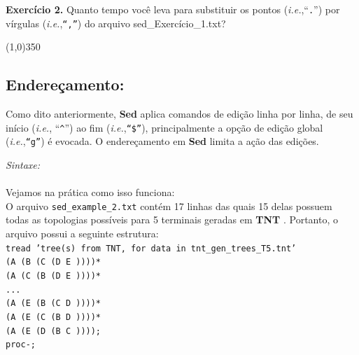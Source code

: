 \begin{refsection}

\begin{blackBlock}{\textbf{Exercício 2.}}\label{tut2:ex:2.\arabic{ex}}
Quanto tempo você leva para substituir os pontos (\textit{i.e.},``\texttt{.}'') por vírgulas (\textit{i.e.},\texttt{``,''}) do arquivo sed\_Exercício\_1.txt?

\begin{center}
\line(1,0){350}\\
\end{center}

\end{blackBlock}

\subsection{Endereçamento:}\label{tut2:sed:address}

	Como dito anteriormente, \textbf{Sed} aplica comandos de edição linha por linha, de seu início (\textit{i.e.}, ``\texttt{\^{}}'') ao fim (\textit{i.e.},\texttt{``\$''}), principalmente a opção de edição global (\textit{i.e.},\texttt{``g''}) é evocada. O endereçamento em \textbf{Sed} limita a ação das edições.\

\textit{Sintaxe:}\\
 \\

Vejamos na prática como isso funciona:\\

O arquivo \texttt{sed\_example\_2.txt} contém 17 linhas das quais 15 delas possuem todas as topologias possíveis para 5 terminais geradas em \textbf{TNT} \parencite{GoloboffEtAl_2008}. Portanto, o arquivo possui a seguinte estrutura:\\

\noindent\texttt{tread 'tree(s) from TNT, for data in tnt\_gen\_trees\_T5.tnt'}\\
\texttt{(A (B (C (D E ))))*}\\
\texttt{(A (C (B (D E ))))*}\\
\texttt{...}\\
\texttt{(A (E (B (C D ))))*}\\
\texttt{(A (E (C (B D ))))*}\\
\texttt{(A (E (D (B C ))));}\\
\texttt{proc-;}\\


\end{refsection}
